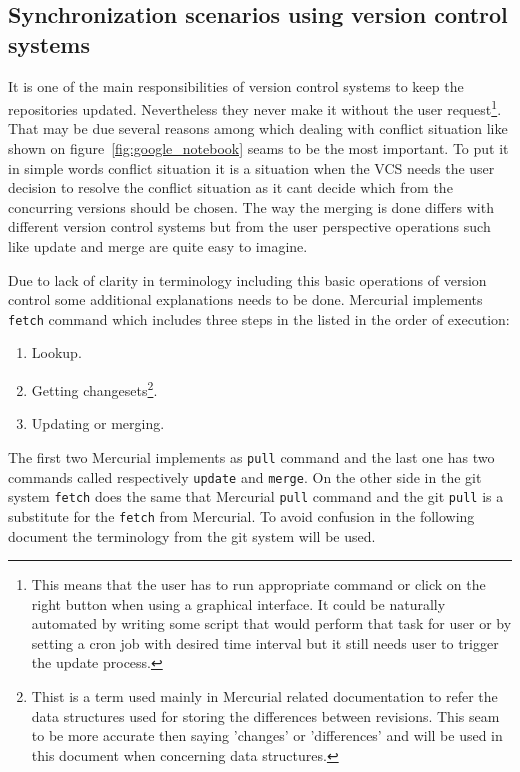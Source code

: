 \subsection{Synchronization scenarios using version control systems}\label{subsec:sync_scenarios}
It is one of the main responsibilities of version control systems to keep the repositories updated. Nevertheless they never make it without the user request\footnote{This means that the user has to run appropriate command or click on the right button when using a graphical interface. It could be naturally automated by writing some script that would perform that task for user or by setting a cron job with desired time interval but it still needs user to trigger the update process.}. That may be due several reasons among which dealing with conflict situation like shown on figure~\ref{fig:google_notebook} seams to be the most important. To put it in simple words conflict situation it is a situation when the VCS needs the user decision to resolve the conflict situation as it cant decide which from the concurring versions should be chosen. The way the merging is done differs with different version control systems but from the user perspective operations such like update and merge are quite easy to imagine. 

Due to lack of clarity in terminology including this basic operations of version control some additional explanations needs to be done. Mercurial implements \texttt{fetch} command  which includes three steps in the listed in  the order of execution:
\begin{enumerate}
\item{Lookup.}
\item{Getting changesets\footnote{Thist is a term used mainly in Mercurial related documentation to refer the data structures used for storing the differences between revisions. This seam to be more accurate then saying 'changes' or 'differences' and will be used in this document when concerning data structures.}.}
\item{Updating or merging.}
\end{enumerate}
The first two Mercurial implements as \texttt{pull} command and the last one has two commands called respectively \texttt{update} and \texttt{merge}. On the other side in the git system \texttt{fetch} does the same that Mercurial \texttt{pull} command and the git \texttt{pull} is a substitute for the \texttt{fetch} from Mercurial. To avoid confusion in the following document the terminology from the git system will be used.

